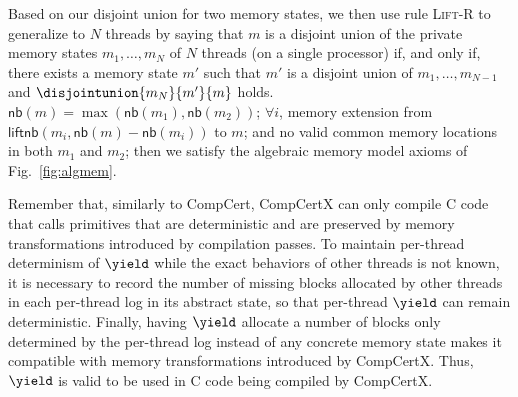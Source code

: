 Based on our disjoint union for two memory states, we then use rule
\textsc{Lift-R} to generalize to $N$ threads by saying that
$m$ is a disjoint union of the private memory states $m_1, \dots, m_N$
of $N$ threads (on a single processor) if, and only if, there exists a
memory state $m'$ such that $m'$ is a disjoint union of $m_1, \dots,
m_{N-1}$ and $\disjointunion{m_N}{m'}{m}$ holds.
$\mathsf{nb}(m) = \max(\mathsf{nb}(m_1), \mathsf{nb}(m_2))$; $\forall i$, memory extension from $\mathsf{liftnb}(m_i, \mathsf{nb}(m) - \mathsf{nb}(m_i))$ to $m$; and no valid common memory locations in both $m_1$ and $m_2$; then we satisfy the algebraic memory model axioms of Fig.~\ref{fig:algmem}.
\ifTR{
\end{lemma}
}{}

Remember that, similarly to CompCert, CompCertX can only compile
C code that calls primitives that are deterministic and are
preserved by memory transformations 
 introduced by compilation passes. To maintain per-thread determinism
of $\yield$ while the exact behaviors of other threads is not
known, it is necessary to record the number of missing blocks
allocated by other threads in each per-thread log in its abstract
state, so that per-thread $\yield$ can remain
deterministic. Finally, having $\yield$ allocate a number of
blocks only determined by the per-thread log instead of any concrete
memory state makes it compatible with memory transformations
introduced by CompCertX. Thus, $\yield$ is valid to be used in
C code being compiled by CompCertX.
